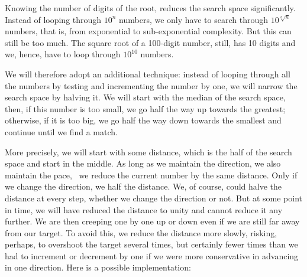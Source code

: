 \documentclass{scrreprt}
\begin{document}
{Knowing the number of digits
of the root, reduces the search space
significantly.
Instead of looping through $10^n$ numbers,
we only have to search through $10^{\sqrt[p]{n}}$ numbers,
that is, from exponential to sub-exponential complexity.
But this can still be too much.
The square root of a 100-digit number, still,
has 10 digits and we, hence, have to loop through
$10^{10}$ numbers.

We will therefore adopt an additional technique:
instead of looping through all the numbers
by testing and incrementing the number by one,
we will narrow the search space by halving it.
We will start with the median of the search space,
then, if this number is too small, 
we go half the way up towards the greatest;
otherwise, if it is too big,
we go half the way down towards the smallest
and continue until we find a match.

More precisely, we will start with some distance,
which is the half of the search space
and start in the middle.
As long as we maintain the direction,
we also maintain the pace, \ie\ we reduce 
the current number by the same distance.
Only if we change the direction,
we half the distance.
We, of course, could halve the distance
at every step, whether we change the direction
or not. But at some point in time,
we will have reduced the distance to unity
and cannot reduce it any further.
We are then creeping one by one up or down
even if we are still far away from our target.
To avoid this, we reduce the distance
more slowly, risking, perhaps, to overshoot the target
several times, but certainly fewer times
than we had to increment or decrement by one
if we were more conservative in advancing
in one direction.
Here is a possible implementation:

}
\end{document}
